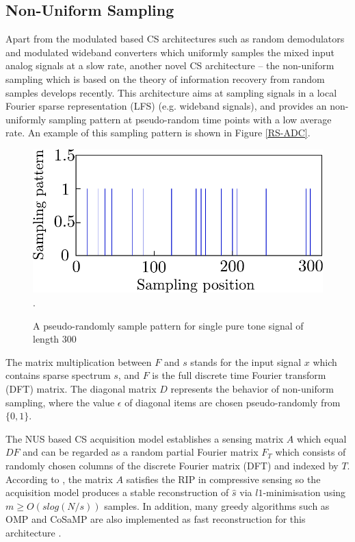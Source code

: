 \subsection{Non-Uniform Sampling}
\indent \indent Apart from the modulated based CS architectures such as random demodulators and modulated wideband converters which uniformly samples the mixed input analog signals at a slow rate, another novel CS architecture -- the non-uniform sampling which is based on the theory of information recovery from random samples \cite{ragheb2007implementation} develops recently. This architecture aims at sampling signals in a local Fourier sparse representation\cite{rauhut2010compressive} (LFS) (e.g. wideband signals), and provides an non-uniformly sampling pattern at pseudo-random time points with a low average rate. An example of this sampling pattern is shown in Figure \ref{RS-ADC}. 
\begin{figure}
\centering
\includegraphics[width=2.6 in]{figs/NUS.pdf}
\DeclareGraphicsExtensions.
\caption{A pseudo-randomly sample pattern for single pure tone signal of length 300}\label{NUS}
\end{figure}

The matrix multiplication between $F$ and $s$ stands for the input signal $x$ which contains sparse spectrum $s$, and $F$ is the full discrete time Fourier transform (DFT) matrix. The diagonal matrix $D$ represents the behavior of non-uniform sampling, where the value $\epsilon$ of diagonal items are chosen pseudo-randomly from $\{0,1\}$. 

The NUS based CS acquisition model establishes a sensing matrix $A$ which equal $DF$ and can be regarded as a random partial Fourier matrix $F_{T}$ which consists of randomly chosen columns of the discrete Fourier matrix (DFT) and indexed by $T$. According to \cite{ragheb2007implementation}, the matrix $A$ satisfies the RIP in compressive sensing so the acquisition model produces a stable reconstruction of $\hat s$ via $l1$-minimisation using $m \geq O(slog(N/s))$ samples\cite{ragheb2007implementation}. In addition, many greedy algorithms such as OMP and CoSaMP are also implemented as fast reconstruction for this architecture \cite{maechler2011random}.

